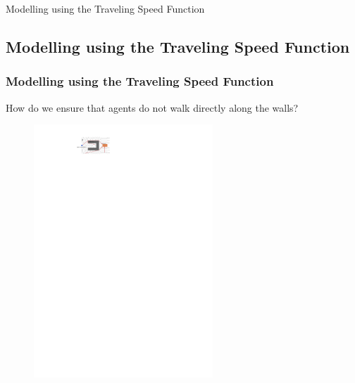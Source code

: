 \documentclass[aspectratio=169,handout]{beamer}
\begin{document}
\begin{frame}[plain]
	\begin{center}
		{\color{myblue} \huge Modelling using the Traveling Speed Function}
	\end{center}
\end{frame}

\subsection{Modelling using the Traveling Speed Function}
\begin{frame}
	\frametitle{Modelling using the Traveling Speed Function}
	How do we ensure that agents do not walk directly along the walls?\\
	\begin{figure}
		\includegraphics[width=0.6\textwidth]{./figs/chicken-eikonal_en.pdf}
	\end{figure}
\end{frame}
\end{document}
